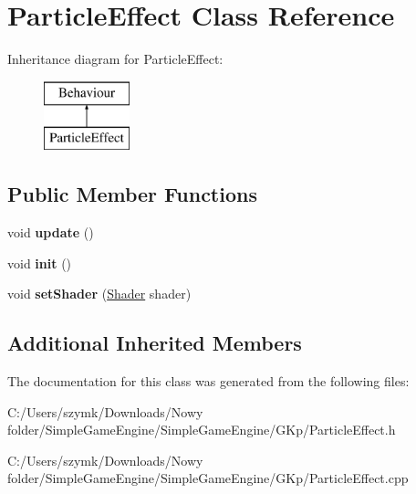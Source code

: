 \hypertarget{class_particle_effect}{}\section{Particle\+Effect Class Reference}
\label{class_particle_effect}
Inheritance diagram for Particle\+Effect\+:\begin{figure}[H]
\begin{center}
\leavevmode
\includegraphics[height=2.000000cm]{class_particle_effect}
\end{center}
\end{figure}
\subsection*{Public Member Functions}
\begin{DoxyCompactItemize}
\item 
\mbox{\label{class_particle_effect_a1286fd1a55670af9e1c2c208cef9108e}} 
void {\bfseries update} ()
\item 
\mbox{\label{class_particle_effect_a899030bedb487dbb707b9787ecbe1cb5}} 
void {\bfseries init} ()
\item 
\mbox{\label{class_particle_effect_a252b170dba69a5b8c8c1e1fa6a1b066b}} 
void {\bfseries set\+Shader} (\hyperlink{class_shader}{Shader} shader)
\end{DoxyCompactItemize}
\subsection*{Additional Inherited Members}


The documentation for this class was generated from the following files\+:\begin{DoxyCompactItemize}
\item 
C\+:/\+Users/szymk/\+Downloads/\+Nowy folder/\+Simple\+Game\+Engine/\+Simple\+Game\+Engine/\+G\+Kp/Particle\+Effect.\+h\item 
C\+:/\+Users/szymk/\+Downloads/\+Nowy folder/\+Simple\+Game\+Engine/\+Simple\+Game\+Engine/\+G\+Kp/Particle\+Effect.\+cpp\end{DoxyCompactItemize}
